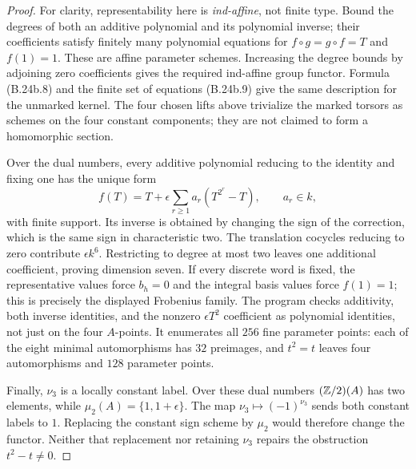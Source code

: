 \begin{proof}
For clarity, representability here is \emph{ind-affine}, not finite
type.  Bound the degrees of both an additive polynomial and its
polynomial inverse; their coefficients satisfy finitely many polynomial
equations for $f\circ g=g\circ f=T$ and $f(1)=1$.  These are affine
parameter schemes.  Increasing the degree bounds by adjoining zero
coefficients gives the required ind-affine group functor.  Formula
(B.24b.8) and the finite set of equations (B.24b.9) give the same
description for the unmarked kernel.  The four chosen lifts above
trivialize the marked torsors as schemes on the four constant components;
they are not claimed to form a homomorphic section.

Over the dual numbers, every additive polynomial reducing to the
identity and fixing one has the unique form
\[
             f(T)=T+\epsilon\sum_{r\ge1}a_r(T^{2^r}-T),
             \qquad a_r\in k,
\]
with finite support.  Its inverse is obtained by changing the sign
of the correction, which is the same sign in characteristic two.
The translation cocycles reducing to zero contribute
$\epsilon k^6$.  Restricting to degree at most two leaves one
additional coefficient, proving dimension seven.  If every discrete
word is fixed, the representative values force $b_h=0$ and the
integral basis values force $f(1)=1$; this is precisely the displayed
Frobenius family.  The program checks additivity, both inverse identities,
and the nonzero $\epsilon T^2$ coefficient as polynomial identities,
not just on the four $A$-points.  It enumerates all $256$ fine parameter
points: each of the eight minimal automorphisms has $32$ preimages,
and $t^2=t$ leaves four automorphisms and $128$ parameter points.

Finally, $\nu_3$ is a locally constant label.  Over these dual numbers
$(\mathbb Z/2)(A)$ has two elements, while $\mu_2(A)=\{1,1+\epsilon\}$.
The map $\nu_3\mapsto(-1)^{\nu_3}$ sends both constant labels to $1$.
Replacing the constant sign scheme by $\mu_2$ would therefore change
the functor.  Neither that replacement nor retaining $\nu_3$ repairs
the obstruction $t^2-t\ne0$.
\end{proof}

